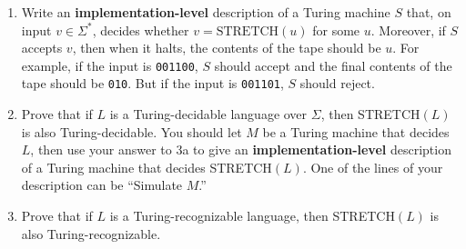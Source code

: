 \documentclass{article}
\newcommand{\s}{\Sigma}
\newcommand{\str}{\texttt}
\newcommand{\newp}{\\[2mm]}
\begin{document}
\begin{enumerate}
    \begin{enumerate}
        \item Write an \textbf{implementation-level} description of a Turing machine $S$ that, on input $v \in \s^*$, decides whether $v = \text{STRETCH}(u)$ for some $u$. Moreover, if $S$ accepts $v$, then when it halts, the contents of the tape should be $u$. For example, if the input is \str{001100}, $S$ should accept and the final contents of the tape should be \str{010}. But if the input is \str{001101}, $S$ should reject.\newp
        
        \item Prove that if $L$ is a Turing-decidable language over $\s$, then STRETCH$(L)$ is also Turing-decidable. You should let $M$ be a Turing machine that decides $L$, then use your answer to 3a to give an \textbf{implementation-level} description of a Turing machine that decides STRETCH$(L)$. One of the lines of your description can be ``Simulate $M$.''\newp
        
        \item Prove that if $L$ is a Turing-recognizable language, then STRETCH$(L)$ is also Turing-recognizable.\newp
        
    \end{enumerate}
\end{enumerate}
\end{document}
